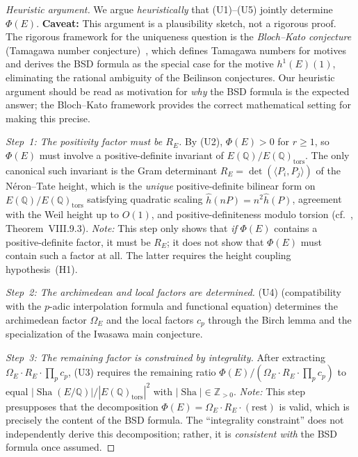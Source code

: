 \documentclass[aps,prd,twocolumn,superscriptaddress,nofootinbib,floatfix]{revtex4-2}
\theoremstyle{definition}
\theoremstyle{remark}
\DeclareMathOperator{\Sha}{Sha}
\begin{document}
\begin{proof}[Heuristic argument]
We argue \textit{heuristically} that (U1)--(U5) jointly determine $\Phi(E)$. \textbf{Caveat:} This argument is a plausibility sketch, not a rigorous proof. The rigorous framework for the uniqueness question is the \textit{Bloch--Kato conjecture} (Tamagawa number conjecture)~\cite{BlochKato1990,FontainePerrinRiou1994}, which defines Tamagawa numbers for motives and derives the BSD formula as the special case for the motive $h^1(E)(1)$, eliminating the rational ambiguity of the Beilinson conjectures. Our heuristic argument should be read as motivation for \textit{why} the BSD formula is the expected answer; the Bloch--Kato framework provides the correct mathematical setting for making this precise.

\textit{Step~1: The positivity factor must be $R_E$.} By (U2), $\Phi(E) > 0$ for $r \geq 1$, so $\Phi(E)$ must involve a positive-definite invariant of $E(\mathbb{Q})/E(\mathbb{Q})_{\mathrm{tors}}$. The only canonical such invariant is the Gram determinant $R_E = \det(\langle P_i, P_j \rangle)$ of the Néron--Tate height, which is the \textit{unique} positive-definite bilinear form on $E(\mathbb{Q})/E(\mathbb{Q})_{\mathrm{tors}}$ satisfying quadratic scaling $\hat{h}(nP) = n^2 \hat{h}(P)$, agreement with the Weil height up to $O(1)$, and positive-definiteness modulo torsion (cf.~\cite{Silverman2009}, Theorem~VIII.9.3). \textit{Note:} This step only shows that \textit{if} $\Phi(E)$ contains a positive-definite factor, it must be $R_E$; it does not show that $\Phi(E)$ must contain such a factor at all. The latter requires the height coupling hypothesis~(H1).

\textit{Step~2: The archimedean and local factors are determined.} (U4) (compatibility with the $p$-adic interpolation formula and functional equation) determines the archimedean factor $\Omega_E$ and the local factors $c_p$ through the Birch lemma and the specialization of the Iwasawa main conjecture.

\textit{Step~3: The remaining factor is constrained by integrality.} After extracting $\Omega_E \cdot R_E \cdot \prod_p c_p$, (U3) requires the remaining ratio $\Phi(E)/(\Omega_E \cdot R_E \cdot \prod_p c_p)$ to equal $|\Sha(E/\mathbb{Q})|/|E(\mathbb{Q})_{\mathrm{tors}}|^2$ with $|\Sha| \in \mathbb{Z}_{>0}$. \textit{Note:} This step presupposes that the decomposition $\Phi(E) = \Omega_E \cdot R_E \cdot (\text{rest})$ is valid, which is precisely the content of the BSD formula. The ``integrality constraint'' does not independently derive this decomposition; rather, it is \textit{consistent with} the BSD formula once assumed.


\end{proof}
\end{document}
